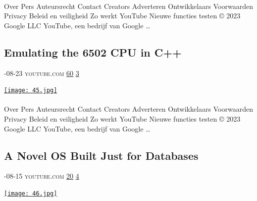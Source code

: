 \documentclass[10pt,a4paper]{article}
\begin{document}
\begin{multicols}{2}
\paragraph{}
Over
Pers
Auteursrecht
Contact
Creators
Adverteren
Ontwikkelaars
Voorwaarden
Privacy
Beleid en veiligheid
Zo werkt YouTube
Nieuwe functies testen
© 2023 Google LLC
YouTube, een bedrijf van Google
\dots\par
\noindent\begin{minipage}{\linewidth}
\medskip
\subsection{Emulating the 6502 CPU in C++}
\textsc{\footnotesize
{\scriptsize\faCalendar}-08-23 
{\scriptsize\faYoutube}\space 
youtube.com 
{\scriptsize\faThumbsOUp}\space 
\href{http://news.ycombinator.com/item?id=37172769\&utm\_term=comment}{60} 
{\scriptsize\faComments}\space 
\href{http://news.ycombinator.com/item?id=37172769\&utm\_term=comment}{3} 
}
\par\medskip\noindent
\href{https://www.youtube.com/watch?v=qJgsuQoy9bc\&utm\_source=hackernewsletter\&utm\_medium=email\&utm\_term=watching}{
    \texttt{[image: 45.jpg]}
}
\end{minipage}
\paragraph{}
Over
Pers
Auteursrecht
Contact
Creators
Adverteren
Ontwikkelaars
Voorwaarden
Privacy
Beleid en veiligheid
Zo werkt YouTube
Nieuwe functies testen
© 2023 Google LLC
YouTube, een bedrijf van Google
\dots\par
\noindent\begin{minipage}{\linewidth}
\medskip
\subsection{A Novel OS Built Just for Databases}
\textsc{\footnotesize
{\scriptsize\faCalendar}-08-15 
{\scriptsize\faYoutube}\space 
youtube.com 
{\scriptsize\faThumbsOUp}\space 
\href{http://news.ycombinator.com/item?id=37179905\&utm\_term=comment}{20} 
{\scriptsize\faComments}\space 
\href{http://news.ycombinator.com/item?id=37179905\&utm\_term=comment}{4} 
}
\par\medskip\noindent
\href{https://www.youtube.com/watch?v=fuDeLnbUkT4\&utm\_source=hackernewsletter\&utm\_medium=email\&utm\_term=watching}{
    \texttt{[image: 46.jpg]}
}
\end{minipage}

\end{multicols}
\end{document}
